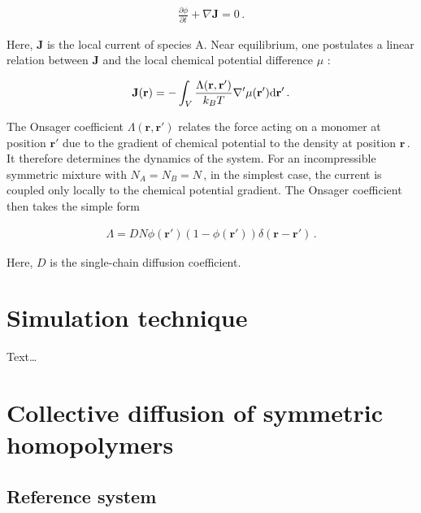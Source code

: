 \documentclass[bachelor,       %
               twoside,        %
               BCOR10mm,       %
                ngerman,english  %
               ]{GAUBM}
\begin{document}
\begin{align}
  \frac{\partial\phi}{\partial t}+\nabla\mathbf{J}=0\,.
  \label{eq:conti}
\end{align}

Here, $\mathbf{J}$ is the local current of species A. Near equilibrium, one postulates a linear relation between $\mathbf J$ and the local chemical potential difference $\mu$ \cite{deGennes80}:


\begin{align}
    \mathbf J(\mathbf{r})=-\int_V\frac{\Lambda(\mathbf{r}, \mathbf{r'})}{k_BT}\nabla '\mu(\mathbf{r'})\text d \mathbf{r'}\,.
    \label{eq:current}
\end{align}

The Onsager coefficient $\Lambda(\mathbf{r}, \mathbf{r'})$ relates the force acting on a monomer at position $\mathbf{r'}$ due to the gradient of chemical potential to the density at position $\mathbf{r}\,$. It therefore determines the dynamics of the system. For an incompressible symmetric mixture with $N_A=N_B=N\,$, in the simplest case, the current is coupled only locally to the chemical potential gradient. The Onsager coefficient then takes the simple form \cite{deGennes80, Binder83}

\begin{align}
  \Lambda=DN\phi(\mathbf{r'})(1-\phi(\mathbf{r'}))\delta(\mathbf{r}-\mathbf{r'})\,.
  \label{eq:onsager}
\end{align}

Here, $D$ is the single-chain diffusion coefficient.

\chapter{Simulation technique}
Text\dots

\chapter{Collective diffusion of symmetric homopolymers}

\section{Reference system}
\end{document}
